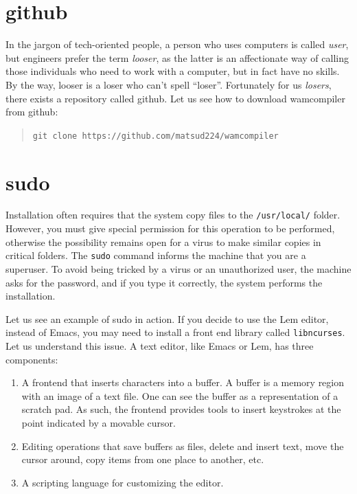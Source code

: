 \documentclass[a4paper,12pt]{book}
\begin{document}
\section{github}
In the jargon of tech-oriented people,
a person who uses computers is called
{\em user}, but engineers
prefer the term {\em looser}, as
the latter is an affectionate way
of calling those individuals who need to work
with a computer, but in fact have no skills. By the way,
looser is a loser who can't spell ``loser''.
Fortunately for us {\em losers}, there exists
a repository called github. Let us see how
to download wamcompiler from github:
\begin{quote}
\verb|git clone https://github.com/matsud224/wamcompiler|
\end{quote}

\section{sudo}

Installation often requires that the
system copy files to the \verb|/usr/local/|
folder. However, you must give special
permission for this operation to be performed,
otherwise the possibility remains open for
a virus to make similar copies in critical folders.
The \verb|sudo| command informs the machine that you
are a superuser. To avoid being tricked by a virus
or an unauthorized user, the machine asks for the
password, and if you type it correctly,
the system performs the installation.

Let us see an example of sudo in action.
If you decide to use the Lem editor, instead
of Emacs, you may need to install a front end
library called \verb|libncurses|. Let us understand
this issue. A text editor, like Emacs or Lem, has
three components:
\begin{enumerate}
\item A frontend that inserts characters into a buffer.
A buffer is a memory region with an image of a
text file. One can see the buffer as a representation
of a scratch pad. As such, the frontend provides tools to
insert keystrokes at the  point indicated by 
a movable cursor.
\item Editing operations that save buffers
as files, delete and insert text, move the
cursor around, copy items from one place to another, etc.
\item A scripting language for customizing the editor.
\end{enumerate}
\end{document}
